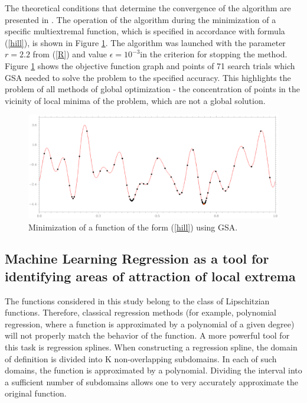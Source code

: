 \documentclass[entropy,article,submit,moreauthors,pdftex]{Definitions/mdpi}
\begin{document}
The theoretical conditions that determine the convergence of the algorithm are presented in \cite{Strongin2000}. 
The operation of the algorithm during the minimization of a specific multiextremal function, which is specified in accordance with formula  (\ref{hill}), is shown in Figure \ref{fig1}. The algorithm was launched with the parameter $r=2.2$ from (\ref{R}) and value $\epsilon = 10^{-3}$in the criterion for stopping the method.
Figure \ref{fig1} shows the objective function graph and points of 71 search trials which GSA needed to solve the problem to the specified accuracy. This highlights the problem of all methods of global optimization - the concentration of points in the vicinity of local minima of the problem, which are not a global solution.

\begin{figure}[H]
\includegraphics[width=1.0\linewidth]{HillAGP90.png}
\caption{Minimization of a function of the form  (\ref{hill}) using GSA.}
\label{fig1}
\end{figure}   


\subsection{Machine Learning Regression as a tool for identifying areas of attraction of local extrema}\label{TreeGSA}

The functions considered in this study belong to the class of Lipschitzian functions. Therefore, classical regression methods (for example, polynomial regression, where a function is approximated by a polynomial of a given degree) will not properly match the behavior of the function.
A more powerful tool for this task is regression splines. When constructing a regression spline, the domain of definition is divided into K non-overlapping subdomains. In each of such domains, the function is approximated by a polynomial. Dividing the interval into a sufficient number of subdomains allows one to very accurately approximate the original function.
\end{document}
